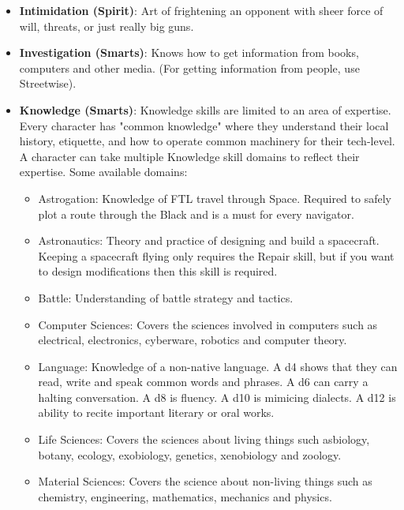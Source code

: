 \documentclass[10pt,twoside]{article}
\begin{document}
\begin{multicols}{2}
\begin{itemize}
\item \textbf{Intimidation (Spirit)}: Art of frightening an opponent with sheer force of will, threats, or just really big guns.

\item \textbf{Investigation (Smarts)}: Knows how to get information from books, computers and other media. (For getting information from people, use Streetwise).

\item \textbf{Knowledge (Smarts)}: Knowledge skills are limited to an area of expertise. Every character has "common knowledge" where they understand their local history, etiquette, and how to operate common machinery for their tech-level. A character can take multiple Knowledge skill domains to reflect their expertise. Some available domains:
\begin{itemize}

\item Astrogation: Knowledge of FTL travel through Space. Required to safely plot a route through the Black and is a must for every navigator.

\item Astronautics: Theory and practice of designing and build a spacecraft. Keeping a spacecraft flying only requires the Repair skill, but if you want to design modifications then this skill is required.

\item Battle: Understanding of battle strategy and tactics.

\item Computer Sciences: Covers the sciences involved in computers such as electrical, electronics, cyberware, robotics and computer theory.

\item Language: Knowledge of a non-native language. A d4 shows that they can read, write and speak common words and phrases. A d6 can carry a halting conversation. A d8 is fluency. A d10 is mimicing dialects. A d12 is ability to recite important literary or oral works.

\item Life Sciences: Covers the sciences about living things such asbiology, botany, ecology, exobiology, genetics, xenobiology and zoology.

\item Material Sciences: Covers the science about non-living things such as chemistry, engineering, mathematics, mechanics and physics.


\end{itemize}
\end{itemize}
\end{multicols}
\end{document}
